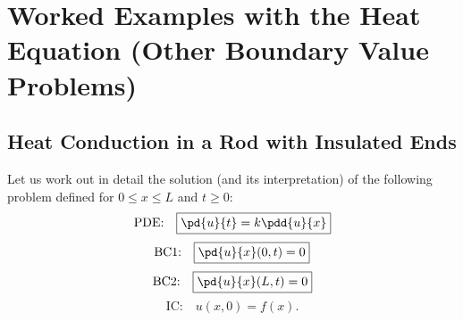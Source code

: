 \section{Worked Examples with the Heat Equation (Other Boundary Value Problems)}
\label{sec:2.4}

\subsection{Heat Conduction in a Rod with Insulated Ends}
\label{sec:2.4.1}

Let us work out in detail the solution (and its interpretation) of the following problem defined for $0 \le x \le L$ and $t \ge 0$:
\begin{equation}
\label{eq:2.4.1}
\text{PDE:}\quad
\boxed{\pd{u}{t} = k\pdd{u}{x}}
\end{equation}
\begin{equation}
\label{eq:2.4.2}
\text{BC1:}\quad
\boxed{\pd{u}{x}(0,t) = 0}
\end{equation}
\begin{equation}
\label{eq:2.4.3}
\text{BC2:}\quad
\boxed{\pd{u}{x}(L,t) = 0}
\end{equation}
\begin{equation}
\label{eq:2.4.4}
\text{IC:}\quad
\boxed{u(x,0) = f(x).}
\end{equation}

